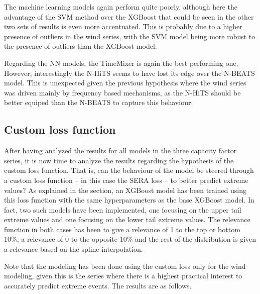 The machine learning models again perform quite poorly, although here the advantage of the SVM method over the XGBoost that could be seen in the other two sets of results is even more accentuated. This is probably due to a higher presence of outliers in the wind series, with the SVM model being more robust to the presence of outliers than the XGBoost model. 

Regarding the NN models, the TimeMixer is again the best performing one. However, interestingly the N-HiTS seems to have lost its edge over the N-BEATS model. This is unexpected given the previous hypothesis where the wind series was driven mainly by frequency based mechanisms, as the N-HiTS should be better equiped than the N-BEATS to capture this behaviour. 
\subsection{Custom loss function}
After having analyzed the results for all models in the three capacity factor series, it is now time to analyze the results regarding the hypothesis of the custom loss function. That is, can the behaviour of the model be steered through a custom loss function -- in this case the SERA loss -- to better predict extreme values? As explained in the  section, an XGBoost model has been trained using this loss function with the same hyperparameters as the base XGBoost model. In fact, two such models have been implemented, one focusing on the upper tail extreme values and one focusing on the lower tail extreme values. The relevance function in both cases has been to give a relevance of 1 to the top or bottom 10\%, a relevance of 0 to the opposite 10\% and the rest of the distribution is given a relevance based on the spline interpolation. 

Note that the modeling has been done using the custom loss only for the wind modeling, given this is the series where there is a highest practical interest to accurately predict extreme events. The results are as follows. 

